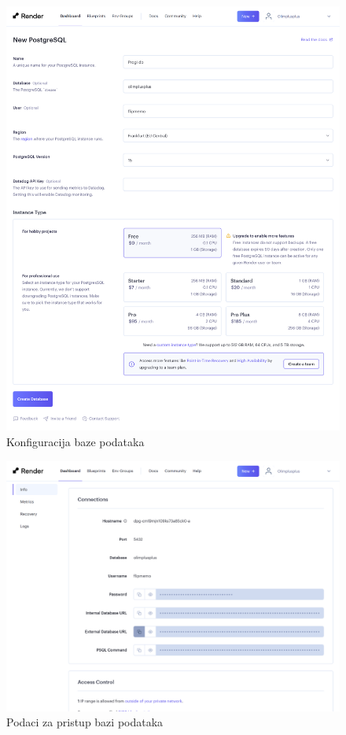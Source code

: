         \begin{figure}[htp]
			\includegraphics[scale=0.17]{slike/deploy_2.png}
			\centering
			\caption{Konfiguracija baze podataka}
            \label{fig:dep-2}
		\end{figure}

        \begin{figure}[htp]
			\includegraphics[scale=0.15]{slike/deploy_3.png}
			\centering
			\caption{Podaci za pristup bazi podataka}
            \label{fig:dep-3}
		\end{figure}

